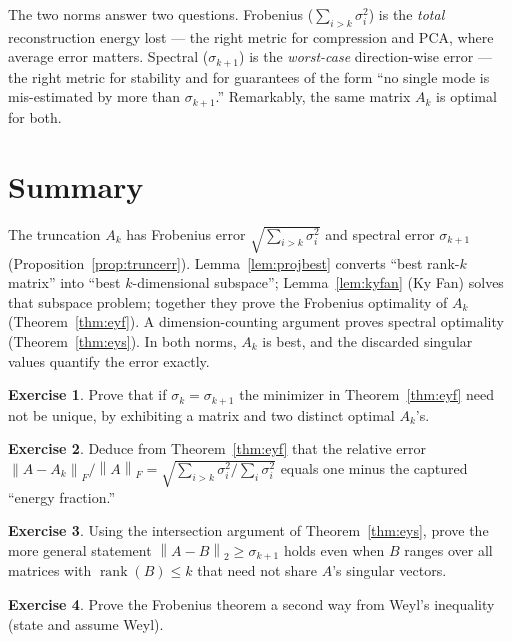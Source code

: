 \documentclass[11pt,oneside]{book}
\theoremstyle{plain}
\theoremstyle{definition}
\newtheorem{exercise}{Exercise}[chapter]
\theoremstyle{remark}
\newcommand{\rank}{\operatorname{rank}}
\newcommand{\norm}[1]{\left\lVert #1 \right\rVert}
\newcommand{\fn}[1]{\norm{#1}_F}
\newcommand{\sn}[1]{\norm{#1}_2}
\begin{document}
\begin{ml_box}
The two norms answer two questions. Frobenius ($\sum_{i>k}\sigma_i^2$) is the
\emph{total} reconstruction energy lost --- the right metric for compression and PCA,
where average error matters. Spectral ($\sigma_{k+1}$) is the \emph{worst-case}
direction-wise error --- the right metric for stability and for guarantees of the form
``no single mode is mis-estimated by more than $\sigma_{k+1}$.'' Remarkably, the same
matrix $A_k$ is optimal for both.
\end{ml_box}

\section*{Summary}
The truncation $A_k$ has Frobenius error $\sqrt{\sum_{i>k}\sigma_i^2}$ and spectral error
$\sigma_{k+1}$ (Proposition~\ref{prop:truncerr}). Lemma~\ref{lem:projbest} converts
``best rank-$k$ matrix'' into ``best $k$-dimensional subspace''; Lemma~\ref{lem:kyfan}
(Ky Fan) solves that subspace problem; together they prove the Frobenius optimality of
$A_k$ (Theorem~\ref{thm:eyf}). A dimension-counting argument proves spectral optimality
(Theorem~\ref{thm:eys}). In both norms, $A_k$ is best, and the discarded singular values
quantify the error exactly.

\begin{exercise}
Prove that if $\sigma_k=\sigma_{k+1}$ the minimizer in Theorem~\ref{thm:eyf} need not be
unique, by exhibiting a matrix and two distinct optimal $A_k$'s.
\end{exercise}
\begin{exercise}
Deduce from Theorem~\ref{thm:eyf} that the relative error
$\fn{A-A_k}/\fn{A}=\sqrt{\sum_{i>k}\sigma_i^2/\sum_i\sigma_i^2}$ equals one minus the
captured ``energy fraction.''
\end{exercise}
\begin{exercise}
Using the intersection argument of Theorem~\ref{thm:eys}, prove the more general
statement $\sn{A-B}\ge\sigma_{k+1}$ holds even when $B$ ranges over all matrices with
$\rank(B)\le k$ that need not share $A$'s singular vectors.
\end{exercise}
\begin{exercise}
Prove the Frobenius theorem a second way from Weyl's inequality (state and assume Weyl).
\end{exercise}

\end{document}

